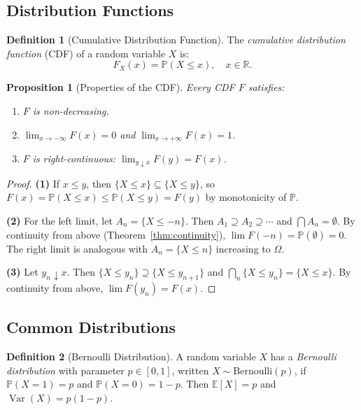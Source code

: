 \documentclass[11pt,a4paper]{article}
\theoremstyle{definition}
\newtheorem{definition}{Definition}[section]
\theoremstyle{plain}
\newtheorem{proposition}[theorem]{Proposition}
\theoremstyle{remark}
\DeclareMathOperator{\Var}{Var}
\newcommand{\E}{\mathbb{E}}
\newcommand{\R}{\mathbb{R}}
\newcommand{\Prob}{\mathbb{P}}
\begin{document}
\subsection{Distribution Functions}
\label{subsec:distributions}

\begin{definition}[Cumulative Distribution Function]
\label{def:cdf}
The \emph{cumulative distribution function} (CDF) of a random variable $X$ is:
\begin{equation}
    F_X(x) = \Prob(X \leq x), \quad x \in \R.
    \label{eq:cdf}
\end{equation}
\end{definition}

\begin{proposition}[Properties of the CDF]
\label{prop:cdf_props}
Every CDF $F$ satisfies:
\begin{enumerate}[nosep]
    \item $F$ is non-decreasing.
    \item $\lim_{x \to -\infty} F(x) = 0$ and $\lim_{x \to +\infty} F(x) = 1$.
    \item $F$ is right-continuous: $\lim_{y \downarrow x} F(y) = F(x)$.
\end{enumerate}
\end{proposition}

\begin{proof}
\textbf{(1)} If $x \leq y$, then $\{X \leq x\} \subseteq \{X \leq y\}$, so $F(x) = \Prob(X \leq x) \leq \Prob(X \leq y) = F(y)$ by monotonicity of $\Prob$.

\textbf{(2)} For the left limit, let $A_n = \{X \leq -n\}$. Then $A_1 \supseteq A_2 \supseteq \cdots$ and $\bigcap A_n = \emptyset$. By continuity from above (Theorem~\ref{thm:continuity}), $\lim F(-n) = \Prob(\emptyset) = 0$. The right limit is analogous with $A_n = \{X \leq n\}$ increasing to $\Omega$.

\textbf{(3)} Let $y_n \downarrow x$. Then $\{X \leq y_n\} \supseteq \{X \leq y_{n+1}\}$ and $\bigcap_n \{X \leq y_n\} = \{X \leq x\}$. By continuity from above, $\lim F(y_n) = F(x)$.
\end{proof}

\subsection{Common Distributions}
\label{subsec:common_dist}

\begin{definition}[Bernoulli Distribution]
\label{def:bernoulli}
A random variable $X$ has a \emph{Bernoulli distribution} with parameter $p \in [0,1]$, written $X \sim \text{Bernoulli}(p)$, if $\Prob(X = 1) = p$ and $\Prob(X = 0) = 1 - p$. Then $\E[X] = p$ and $\Var(X) = p(1-p)$.
\end{definition}
\end{document}
